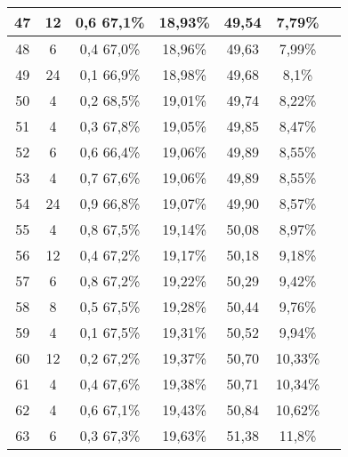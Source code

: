 \begin{longtable}{|c|c|c|c|c|c|c|}
47 & 12 & 0,6 67,1\% & 18,93\% & 49,54 & 7,79\% \\ \hline
48 & 6 & 0,4 67,0\% & 18,96\% & 49,63 & 7,99\% \\ \hline
49 & 24 & 0,1 66,9\% & 18,98\% & 49,68 & 8,1\% \\ \hline
50 & 4 & 0,2 68,5\% & 19,01\% & 49,74 & 8,22\% \\ \hline
51 & 4 & 0,3 67,8\% & 19,05\% & 49,85 & 8,47\% \\ \hline
52 & 6 & 0,6 66,4\% & 19,06\% & 49,89 & 8,55\% \\ \hline
53 & 4 & 0,7 67,6\% & 19,06\% & 49,89 & 8,55\% \\ \hline
54 & 24 & 0,9 66,8\% & 19,07\% & 49,90 & 8,57\% \\ \hline
55 & 4 & 0,8 67,5\% & 19,14\% & 50,08 & 8,97\% \\ \hline
56 & 12 & 0,4 67,2\% & 19,17\% & 50,18 & 9,18\% \\ \hline
57 & 6 & 0,8 67,2\% & 19,22\% & 50,29 & 9,42\% \\ \hline
58 & 8 & 0,5 67,5\% & 19,28\% & 50,44 & 9,76\% \\ \hline
59 & 4 & 0,1 67,5\% & 19,31\% & 50,52 & 9,94\% \\ \hline
60 & 12 & 0,2 67,2\% & 19,37\% & 50,70 & 10,33\% \\ \hline
61 & 4 & 0,4 67,6\% & 19,38\% & 50,71 & 10,34\% \\ \hline
62 & 4 & 0,6 67,1\% & 19,43\% & 50,84 & 10,62\% \\ \hline
63 & 6 & 0,3 67,3\% & 19,63\% & 51,38 & 11,8\% \\ \hline
	\end{longtable}
\normalsize